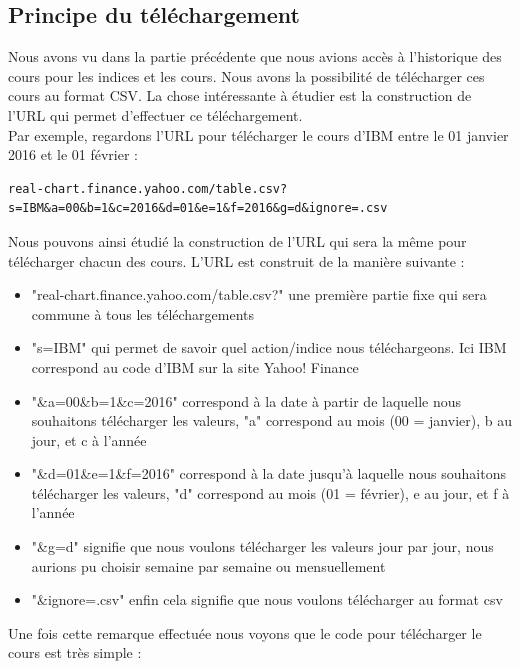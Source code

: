 \subsection{Principe du téléchargement}

Nous avons vu dans la partie précédente que nous avions accès à l'historique des cours pour les indices et les cours. Nous avons la possibilité de télécharger ces cours au format CSV. La chose intéressante à étudier est la construction de l'URL qui permet d'effectuer ce téléchargement. \\ 

Par exemple, regardons l'URL pour télécharger le cours d'IBM entre le 01 janvier 2016 et le 01 février : 
\begin{lstlisting}
real-chart.finance.yahoo.com/table.csv?s=IBM&a=00&b=1&c=2016&d=01&e=1&f=2016&g=d&ignore=.csv
\end{lstlisting}
Nous pouvons ainsi étudié la construction de l'URL qui sera la même pour télécharger chacun des cours. L'URL est construit de la manière suivante : 
\begin{itemize} 
\item "real-chart.finance.yahoo.com/table.csv?" une première partie fixe qui sera commune à tous les téléchargements 
\item "s=IBM" qui permet de savoir quel action/indice nous téléchargeons. Ici IBM correspond au code d'IBM sur la site Yahoo! Finance
\item "\&a=00\&b=1\&c=2016" correspond à la date à partir de laquelle nous souhaitons télécharger les valeurs, "a" correspond au mois (00 = janvier), b au jour, et c à l'année
\item "\&d=01\&e=1\&f=2016" correspond à la date jusqu'à laquelle nous souhaitons télécharger les valeurs, "d" correspond au mois (01 = février), e au jour, et f à l'année
\item "\&g=d" signifie que nous voulons télécharger les valeurs jour par jour, nous aurions pu choisir semaine par semaine ou mensuellement
\item "\&ignore=.csv" enfin cela signifie que nous voulons télécharger au format csv
\end{itemize}

Une fois cette remarque effectuée nous voyons que le code pour télécharger le cours est très simple : 

